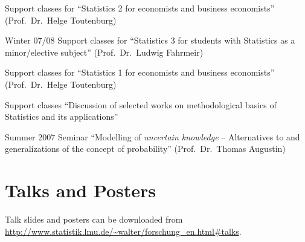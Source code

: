 \documentclass[a4paper]{simplecv}
\begin{document}
\begin{topic}
                    Support classes for ``Statistics 2 for economists and business economists'' (Prof.\ Dr.\ Helge Toutenburg)

\item[Winter 07/08] Support classes for ``Statistics 3 for students with Statistics as a minor/elective subject'' (Prof.\ Dr.\ Ludwig Fahrmeir)

                    Support classes for ``Statistics 1 for economists and business economists'' (Prof.\ Dr.\ Helge Toutenburg)

                    Support classes ``Discussion of selected works on methodological basics of Statistics and its applications''

\item[Summer 2007]  Seminar ``Modelling of \emph{uncertain knowledge} -- Alternatives to and generalizations of the concept of probability'' (Prof.\ Dr.\ Thomas Augustin)
\end{topic}


\section{Talks and Posters}
\label{talks}

Talk slides and posters can be downloaded from \url{http://www.statistik.lmu.de/~walter/forschung_en.html#talks}.
\end{document}
